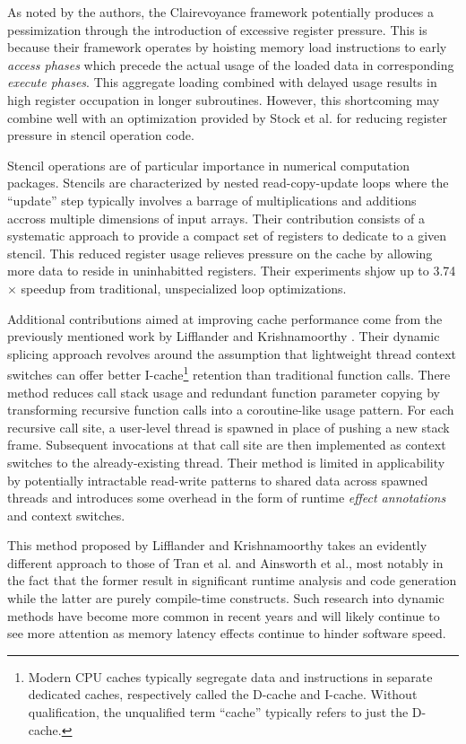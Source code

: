 \documentclass[nobib]{tufte-handout}
\begin{document}
As noted by the authors, the Clairevoyance framework potentially produces a pessimization through the introduction of excessive register pressure.  This is because their framework operates by hoisting memory load instructions to early \emph{access phases} which precede the actual usage of the loaded data in corresponding \emph{execute phases}.  This aggregate loading combined with delayed usage results in high register occupation in longer subroutines.  However, this shortcoming may combine well with an optimization provided by Stock et al. for reducing register pressure in stencil operation code.  

Stencil operations are of particular importance in numerical computation packages.  Stencils are characterized by nested read-copy-update loops where the ``update'' step typically involves a barrage of multiplications and additions accross multiple dimensions of input arrays.  Their contribution consists of a systematic approach to provide a compact set of registers to dedicate to a given stencil.  This reduced register usage relieves pressure on the cache by allowing more data to reside in uninhabitted registers.  Their experiments shjow up to 3.74$\times$ speedup from traditional, unspecialized loop optimizations.  

Additional contributions aimed at improving cache performance come from the previously mentioned work by Lifflander and Krishnamoorthy \cite{Lifflander}.  Their dynamic splicing approach revolves around the assumption that lightweight thread context switches can offer better I-cache\footnote{Modern CPU caches typically segregate data and instructions in separate dedicated caches, respectively called the D-cache and I-cache.  Without qualification, the unqualified term ``cache'' typically refers to just the D-cache.} retention than traditional function calls.  There method reduces call stack usage and redundant function parameter copying by transforming recursive function calls into a coroutine-like usage pattern.  For each recursive call site, a user-level thread is spawned in place of pushing a new stack frame.  Subsequent invocations at that call site are then implemented as context switches to the already-existing thread.  Their method is limited in applicability by potentially intractable read-write patterns to shared data across spawned threads and introduces some overhead in the form of runtime \emph{effect annotations} and context switches. 

This method proposed by Lifflander and Krishnamoorthy takes an evidently different approach to those of Tran et al. and Ainsworth et al., most notably in the fact that the former result in significant runtime analysis and code generation while the latter are purely compile-time constructs.  Such research into dynamic methods have become more common in recent years and will likely continue to see more attention as memory latency effects continue to hinder software speed.  
\end{document}
